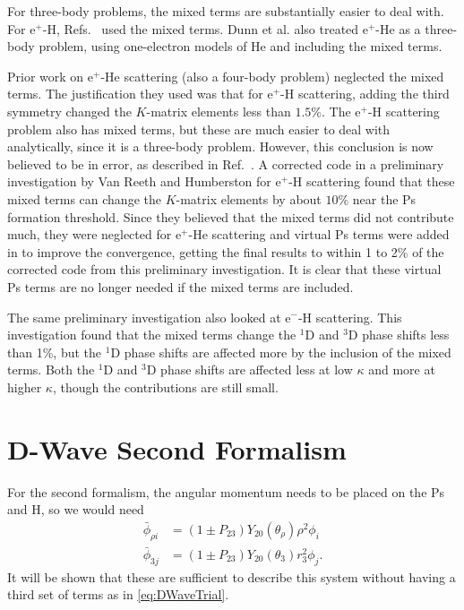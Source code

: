 \documentclass[Dissertation.tex]{subfiles}
\begin{document}
For three-body problems, the mixed terms are substantially easier to deal
with. For e$^+$-H, Refs.~\cite{Brown1985a,BrownThesis,WattsThesis,Humberston1997,VanReeth1997}
used the mixed terms. Dunn et al. \cite{Dunn2000,DunnThesis} also treated
e$^+$-He as a three-body problem, using one-electron models of He and
including the mixed terms.

Prior work \cite{VanReeth1997,VanReethThesis} on e$^+$-He scattering (also a
four-body problem) neglected the mixed terms. The justification they used was
that for e$^+$-H scattering, adding the third symmetry changed the $K$-matrix
elements less than $1.5\%$. The e$^+$-H scattering problem also has mixed
terms, but these are much easier to deal with analytically, since it is a
three-body problem. However, this conclusion is now believed to be in error, as
described in Ref.~\cite{Woods2015}. A corrected code in a preliminary
investigation by Van Reeth and Humberston \cite{VanReeth2015} for e$^+$-H
scattering found that these mixed terms can change the $K$-matrix elements by
about $10\%$ near the Ps formation threshold. Since they believed that the
mixed terms did not contribute much, they were neglected for e$^+$-He scattering
and virtual Ps terms were added in to improve the convergence, getting the final
results to within 1 to 2\% of the corrected code from this preliminary
investigation. It is clear that these virtual Ps terms are no longer needed if
the mixed terms are included.

The same preliminary investigation \cite{VanReeth2015} also looked at e$^-$-H
scattering. This investigation found that the mixed terms change the $^1$D and
$^3$D phase shifts less than 1\%, but the $^1$D phase shifts are affected more
by the inclusion of the mixed terms. Both the $^1$D and $^3$D phase shifts are
affected less at low $\kappa$ and more at higher $\kappa$, though the
contributions are still small.


\section{D-Wave Second Formalism}
\label{sec:DSecondForm}
For the second formalism, the angular momentum needs to be placed on the Ps and
H, so we would need
\begin{subequations}
\label{eq:DWave2ndPhiBar}
\begin{align}
\bar{\phi}_{\rho i} &= \left(1 \pm P_{23}\right) Y_{20}(\theta_\rho) \rho^2 \phi_i \label{eq:DWave2ndPhi1i}\\
\bar{\phi}_{3j} &= \left(1 \pm P_{23}\right) Y_{20}(\theta_3) r_3^2 \phi_j \label{eq:DWave2ndPhi2j}.
\end{align}
\end{subequations}
It will be shown that these are sufficient to describe this system without 
having a third set of terms as in \cref{eq:DWaveTrial}.
\end{document}
